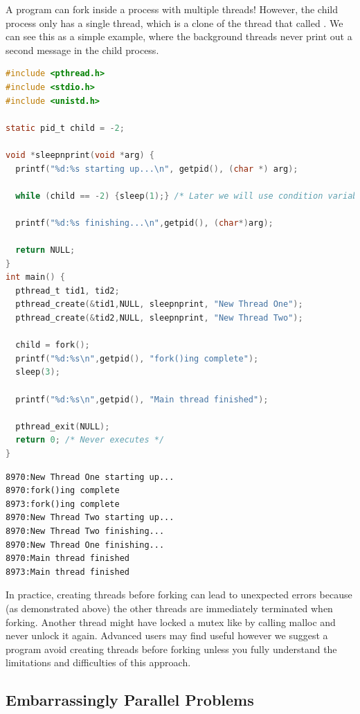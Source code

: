A program can fork inside a process with multiple threads!
However, the child process only has a single thread, which is a clone of the thread that called .
We can see this as a simple example, where the background threads never print out a second message in the child process.

\begin{lstlisting}[language=C]
#include <pthread.h>
#include <stdio.h>
#include <unistd.h>

static pid_t child = -2;

void *sleepnprint(void *arg) {
  printf("%d:%s starting up...\n", getpid(), (char *) arg);

  while (child == -2) {sleep(1);} /* Later we will use condition variables */

  printf("%d:%s finishing...\n",getpid(), (char*)arg);

  return NULL;
}
int main() {
  pthread_t tid1, tid2;
  pthread_create(&tid1,NULL, sleepnprint, "New Thread One");
  pthread_create(&tid2,NULL, sleepnprint, "New Thread Two");

  child = fork();
  printf("%d:%s\n",getpid(), "fork()ing complete");
  sleep(3);

  printf("%d:%s\n",getpid(), "Main thread finished");

  pthread_exit(NULL);
  return 0; /* Never executes */
}
\end{lstlisting}

\begin{verbatim}
8970:New Thread One starting up...
8970:fork()ing complete
8973:fork()ing complete
8970:New Thread Two starting up...
8970:New Thread Two finishing...
8970:New Thread One finishing...
8970:Main thread finished
8973:Main thread finished
\end{verbatim}

In practice, creating threads before forking can lead to unexpected errors because (as demonstrated above) the other threads are immediately terminated when forking.
Another thread might have locked a mutex like by calling malloc and never unlock it again.
Advanced users may find  useful however we suggest a program avoid creating threads before forking unless you fully understand the limitations and difficulties of this approach.

\subsection{Embarrassingly Parallel Problems}


